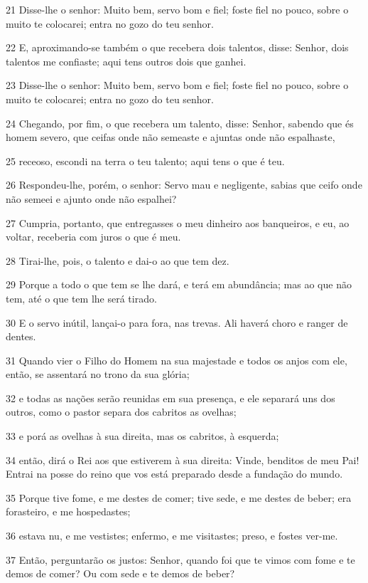 \par 21 Disse-lhe o senhor: Muito bem, servo bom e fiel; foste fiel no pouco, sobre o muito te colocarei; entra no gozo do teu senhor.
\par 22 E, aproximando-se também o que recebera dois talentos, disse: Senhor, dois talentos me confiaste; aqui tens outros dois que ganhei.
\par 23 Disse-lhe o senhor: Muito bem, servo bom e fiel; foste fiel no pouco, sobre o muito te colocarei; entra no gozo do teu senhor.
\par 24 Chegando, por fim, o que recebera um talento, disse: Senhor, sabendo que és homem severo, que ceifas onde não semeaste e ajuntas onde não espalhaste,
\par 25 receoso, escondi na terra o teu talento; aqui tens o que é teu.
\par 26 Respondeu-lhe, porém, o senhor: Servo mau e negligente, sabias que ceifo onde não semeei e ajunto onde não espalhei?
\par 27 Cumpria, portanto, que entregasses o meu dinheiro aos banqueiros, e eu, ao voltar, receberia com juros o que é meu.
\par 28 Tirai-lhe, pois, o talento e dai-o ao que tem dez.
\par 29 Porque a todo o que tem se lhe dará, e terá em abundância; mas ao que não tem, até o que tem lhe será tirado.
\par 30 E o servo inútil, lançai-o para fora, nas trevas. Ali haverá choro e ranger de dentes.
\par 31 Quando vier o Filho do Homem na sua majestade e todos os anjos com ele, então, se assentará no trono da sua glória;
\par 32 e todas as nações serão reunidas em sua presença, e ele separará uns dos outros, como o pastor separa dos cabritos as ovelhas;
\par 33 e porá as ovelhas à sua direita, mas os cabritos, à esquerda;
\par 34 então, dirá o Rei aos que estiverem à sua direita: Vinde, benditos de meu Pai! Entrai na posse do reino que vos está preparado desde a fundação do mundo.
\par 35 Porque tive fome, e me destes de comer; tive sede, e me destes de beber; era forasteiro, e me hospedastes;
\par 36 estava nu, e me vestistes; enfermo, e me visitastes; preso, e fostes ver-me.
\par 37 Então, perguntarão os justos: Senhor, quando foi que te vimos com fome e te demos de comer? Ou com sede e te demos de beber?
